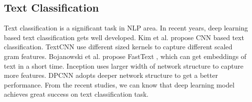 \subsection{Text Classification}
\label{sec:textclassification}
Text classification is a significant task in NLP area. In recent years, deep learning based text classification gets well developed. Kim et al. \cite{DBLP:conf/emnlp/Kim14} propose CNN based text classification. TextCNN use different sized kernels to capture different scaled gram features. Bojanowski et al. propose FastText  \cite{DBLP:journals/tacl/BojanowskiGJM17}, which can get embeddings of text in a short time. Inception \cite{DBLP:journals/corr/SzegedyLJSRAEVR14} uses larger width of network structure to capture more features. DPCNN \cite{DBLP:conf/acl/JohnsonZ17} adopts deeper network structure to get a better performance. From the recent studies, we can know that deep learning model achieves great success on text classification task.
